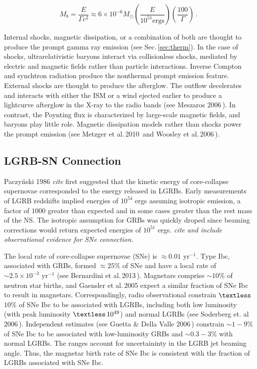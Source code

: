 \documentclass{article}
\begin{document}
\begin{equation}
M_{b} = \frac{E}{\Gamma c^2} \approx 6 \times 10^{-6} M_{\odot} \left(\frac{E}{10^{51} \mathrm{ergs}}\right) \left(\frac{100}{\Gamma}\right)\,.
\end{equation}

Internal shocks, magnetic dissipation, or a combination of both are thought to produce the prompt gamma ray emission (see Sec.\,\ref{sec:therm}). In the case of shocks, ultrarelativistic baryons interact via collisionless shocks, mediated by electric and magnetic fields rather than particle interactions. Inverse Compton and synchtron radiation produce the nonthermal prompt emission feature. External shocks are thought to produce the afterglow. The outflow decelerates and interacts with either the ISM or a wind ejected earlier to produce a lightcurve afterglow in the X-ray to the radio bands (see Meszaros 2006\,\cite{Meszaros:2006rc}). In contrast, the Poynting flux is characterized by large-scale magnetic fields, and baryons play little role. Magnetic dissipation models rather than shocks power the prompt emission (see Metzger et al.\,2010\,\cite{Metzger:2010pp} and Woosley et al.\,2006\,\cite{Woosley:2006fn}).

\subsection{LGRB-SN Connection}

Paczy\'nski 1986 \textit{cite} first suggested that the kinetic energy of core-collapse supernovae corresponded to the energy released in LGRBs. Early measurements of LGRB redshifts implied energies of $10^{54}$ ergs assuming isotropic emission, a factor of $1000$ greater than expected and in some cases greater than the rest mass of the NS. The isotropic assumption for GRBs was quickly droped since beaming corrections would return expected energies of $10^{51}$ ergs. \textit{cite and include observational evidence for SNe connection}.

The local rate of core-collapse supernovae (SNe) is $\approx 0.01$ yr$^{-1}$. Type Ibc, associated with GRBs, formed $\approx 25\%$ of SNe and have a local rate of $\sim 2.5 \times 10^{-3}$ yr$^{-1}$ (see Bernardini et al.\,2013\,\cite{Bernardini:2013nfa}). Magnetars comprise $\sim 10\%$ of neutron star births, and Gaensler et al.\,2005 \cite{Gaensler:2005qk} expect a similar fraction of SNe Ibc to result in magnetars. Correspondingly, radio observational constrain $\textless$\,$10\%$ of SNe Ibc to be associated with LGRBs, including both low luminosity (with peak luminosity $\textless\,10^{49}$) and normal LGRBs (see Soderberg et. al 2006\,\cite{Soderberg:2006vh}). Independent estimates (see Guetta \& Della Valle 2006\,\cite{Guetta:2006gq}) constrain $\sim 1-9\%$ of SNe Ibc to be associated with low-luminosity GRBs and $\sim 0.3-3\%$ with normal LGRBs. The ranges account for uncertaininty in the LGRB jet beaming angle. Thus, the magnetar birth rate of SNe Ibc is consistent with the fraction of LGRBs associated with SNe Ibc.
\end{document}
